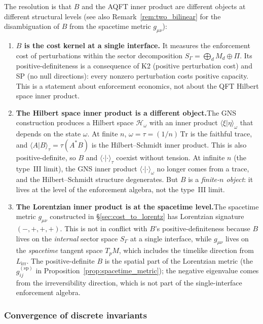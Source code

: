 \documentclass[11pt,a4paper]{article}
\theoremstyle{definition}
\begin{document}
The resolution is that $B$ and the AQFT inner product are different
objects at different structural levels (see also
Remark~\ref{rem:two_bilinear} for the disambiguation of $B$ from the
spacetime metric $g_{\mu\nu}$):
\begin{enumerate}[label=(\alph*),nosep]
  \item \textbf{$B$ is the cost kernel at a single interface.}\quad
  It measures the enforcement cost of perturbations within the sector
  decomposition $S_\Gamma = \bigoplus_d M_d \oplus \Pi$.  Its
  positive-definiteness is a consequence of K2 (positive perturbation
  cost) and SP (no null directions): every nonzero perturbation costs
  positive capacity.  This is a statement about enforcement economics,
  not about the QFT Hilbert space inner product.
  \item \textbf{The Hilbert space inner product is a different
  object.}\quad The GNS construction produces a Hilbert space
  $\mathcal{H}_\omega$ with an inner product
  $\langle\xi|\eta\rangle_\omega$ that depends on the state $\omega$.
  At finite $n$, $\omega = \tau = (1/n)\,\mathrm{Tr}$ is the
  faithful trace, and $\langle A|B\rangle_\tau = \tau(A^*B)$ is the
  Hilbert--Schmidt inner product.  This is also positive-definite, so
  $B$ and $\langle\cdot|\cdot\rangle_\tau$ coexist without tension.
  At infinite $n$ (the type~III limit), the GNS inner product
  $\langle\cdot|\cdot\rangle_\omega$ no longer comes from a trace, and
  the Hilbert--Schmidt structure degenerates.  But $B$ is a
  \emph{finite-$n$ object}: it lives at the level of the enforcement
  algebra, not the type~III limit.
  \item \textbf{The Lorentzian inner product is at the spacetime
  level.}\quad The spacetime metric $g_{\mu\nu}$ constructed in
  \S\ref{sec:cost_to_lorentz} has Lorentzian signature $(-,+,+,+)$.
  This is not in conflict with $B$'s positive-definiteness because
  $B$ lives on the \emph{internal} sector space $S_\Gamma$ at a
  single interface, while $g_{\mu\nu}$ lives on the \emph{spacetime}
  tangent space $T_pM$, which includes the timelike direction from
  $L_{\mathrm{irr}}$.  The positive-definite $B$ is the spatial part
  of the Lorentzian metric (the $g_{ij}^{(\mathrm{sp})}$ in
  Proposition~\ref{prop:spacetime_metric}); the negative eigenvalue
  comes from the irreversibility direction, which is not part of the
  single-interface enforcement algebra.
\end{enumerate}


\subsubsection{Convergence of discrete invariants}
\label{sec:convergence}
\end{document}
